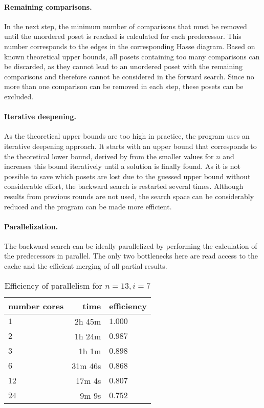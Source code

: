 \documentclass[twoside,leqno,twocolumn]{article}
\begin{document}
\paragraph{Remaining comparisons.}
In the next step, the minimum number of comparisons that must be removed until the unordered poset is reached is calculated for each predecessor.
This number corresponds to the edges in the corresponding Hasse diagram.
Based on known theoretical upper bounds, all posets containing too many comparisons can be discarded, as they cannot lead to an unordered poset with the remaining comparisons and therefore cannot be considered in the forward search.
Since no more than one comparison can be removed in each step, these posets can be excluded.

\paragraph{Iterative deepening.}
As the theoretical upper bounds are too high in practice, the program uses an iterative deepening approach.
It starts with an upper bound that corresponds to the theoretical lower bound, derived by  from the smaller values for $n$ and increases this bound iteratively until a solution is finally found.
As it is not possible to save which posets are lost due to the guessed upper bound without considerable effort, the backward search is restarted several times.
Although results from previous rounds are not used, the search space can be considerably reduced and the program can be made more efficient.

\paragraph{Parallelization.} \label{sec:backward:parallelisation}
The backward search can be ideally parallelized by performing the calculation of the predecessors in parallel.
The only two bottlenecks here are read access to the cache and the efficient merging of all partial results.

\begin{table}[!t]
  \renewcommand{\arraystretch}{1.1}
  \caption{Efficiency of parallelism for $n = 13, i = 7$}
  \label{table:backward-parallel}
  \centering
  \small
  \begin{tabular}{l|r|l}
    \textbf{number cores} & \textbf{time} & \textbf{efficiency} \\
    \hline
    $1$                   & 2h 45m        & $1.000$             \\
    $2$                   & 1h 24m        & $0.987$             \\ %
    $3$                   & 1h 1m         & $0.898$             \\
    $6$                   & 31m 46s       & $0.868$             \\
    $12$                  & 17m 4s        & $0.807$             \\
    $24$                  & 9m 9s         & $0.752$             \\
  \end{tabular}
\end{table}
\end{document}
